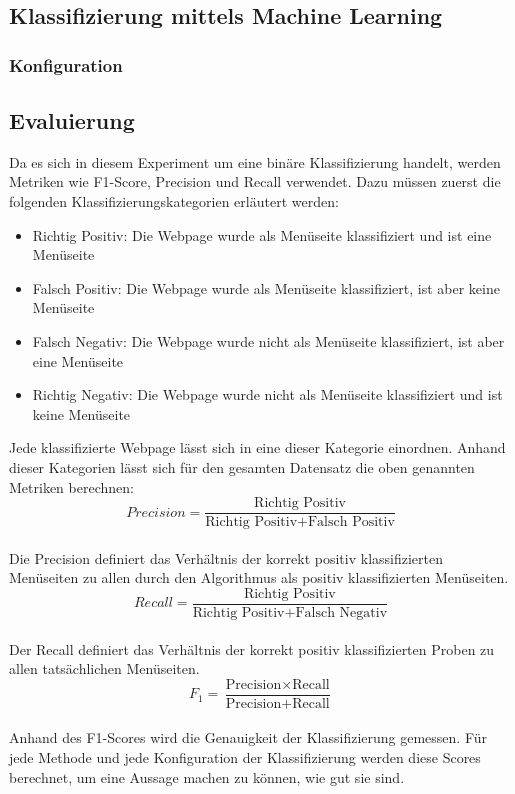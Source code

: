 \subsection{Klassifizierung mittels Machine Learning}
\subsubsection{Konfiguration}
\subsection{Evaluierung}
Da es sich in diesem Experiment um eine binäre Klassifizierung handelt, werden Metriken wie F1-Score, Precision und Recall verwendet.
Dazu müssen zuerst die folgenden Klassifizierungskategorien erläutert werden:
\begin{itemize}
	\item Richtig Positiv: Die Webpage wurde als Menüseite klassifiziert und ist eine Menüseite
	\item Falsch Positiv: Die Webpage wurde als Menüseite klassifiziert, ist aber keine Menüseite
	\item Falsch Negativ: Die Webpage wurde nicht als Menüseite klassifiziert, ist aber eine Menüseite
	\item Richtig Negativ: Die Webpage wurde nicht als Menüseite klassifiziert und ist keine Menüseite
\end{itemize}
Jede klassifizierte Webpage lässt sich in eine dieser Kategorie einordnen.
Anhand dieser Kategorien lässt sich für den gesamten Datensatz die oben genannten Metriken berechnen:\\
\[Precision=\frac{\text{Richtig Positiv}}{\text{Richtig Positiv} + \text{Falsch Positiv}}\]\\
Die Precision definiert das Verhältnis der korrekt positiv klassifizierten Menüseiten zu allen durch den Algorithmus als positiv klassifizierten Menüseiten.\\
\[Recall=\frac{\text{Richtig Positiv}}{\text{Richtig Positiv} + \text{Falsch Negativ}}\]\\
Der Recall definiert das Verhältnis der korrekt positiv klassifizierten Proben zu allen tatsächlichen Menüseiten.\\
\[F_{1}=\frac{\text{Precision} \times \text{Recall}}{\text{Precision} + \text{Recall}}\]\\
Anhand des F1-Scores wird die Genauigkeit der Klassifizierung gemessen.
Für jede Methode und jede Konfiguration der Klassifizierung werden diese Scores berechnet, um eine Aussage machen zu können, wie gut sie sind.
